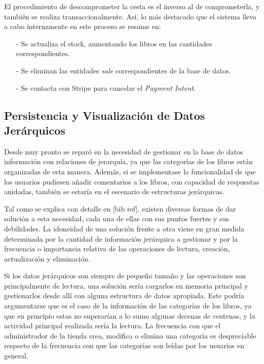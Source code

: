 \documentclass[a4paper]{article}
\begin{document}
    El procedimiento de descomprometer la cesta es el inverso al de comprometerla, y también se realiza transaccionalmente. Así, lo más destacado que el sistema lleva a cabo internamente en este proceso se resume en:
    
    \begin{itemize}
    	\item[-] Se actualiza el stock, aumentando los libros en las cantidades correspondientes.
    	\item[-] Se eliminan las entidades \emph{sale} correspondientes de la base de datos.
    	\item[-] Se contacta con Stripe para cancelar el \emph{Payment Intent}.
    \end{itemize}

    \subsection[Datos Jerárquicos]{Persistencia y Visualización de Datos Jerárquicos} \label{sec:hierarchy}
    Desde muy pronto se reparó en la necesidad de gestionar en la base de datos información con relaciones de jerarquía, ya que las categorías de los libros están organizadas de esta manera. Además, si se implementase la funcionalidad de que los usuarios pudiesen añadir comentarios a los libros, con capacidad de respuestas anidadas, también se estaría en el escenario de estructuras jerárquicas.
    
    Tal como se explica con detalle en [bib ref], existen diversas formas de dar solución a esta necesidad, cada una de ellas con sus puntos fuertes y sus debilidades. La idoneidad de una solución frente a otra viene en gran medida determinada por la cantidad de información jerárquica a gestionar y por la frecuencia o importancia relativa de las operaciones de lectura, creación, actualización y eliminación.
    
    Si los datos jerárquicos son siempre de pequeño tamaño y las operaciones son principalmente de lectura, una solución sería cargarlos en memoria principal y gestionarlos desde allí con alguna estructura de datos apropiada. Este podría argumentarse que es el caso de la información de las categorías de los libros, ya que en principio estas no superarían a lo sumo algunas decenas de centenas, y la actividad principal realizada sería la lectura. La frecuencia con que el administrador de la tienda crea, modifica o elimina una categoría es despreciable respecto de la frecuencia con que las categorías son leídas por los usuarios en general.
    
\end{document}
